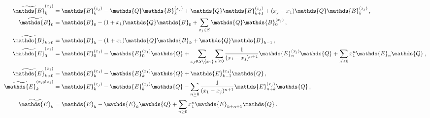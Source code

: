\documentclass[12pt]{article}
\numberwithin{equation}{section}
\numberwithin{figure}{section}
\newcommand{\B}{\mathds{B}}
\newcommand{\E}{\mathds{E}}
\newcommand{\Q}{\mathds{Q}}
\begin{document}
      \begin{align*}
        \widetilde \B^{(x_j)}_k &=
          \B^{(x_j)}_k - \Q \B^{(x_j)}_k 
          + \Q \B^{(x_j)}_{k+1}  
          + (x_j-x_1) \Q \B^{(x_j)}_k \,, 
        \\
        \widetilde \B_0 &=
          \B_0 - (1+x_1) \Q \B_0 
        + \sum\limits_{x_j \in S} \Q \B^{(x_j)}_0  \,,
        \\
        \widetilde \B_{k>0} &=
          \B_k - (1+x_1) \Q \B_k 
          + \Q \B_{k-1} \,,
        \\
        \widetilde \E^{(x_1)}_0 &=
          \E^{(x_1)}_0 - \E^{(x_1)}_0 \Q 
          + \sum\limits_{x_j \in S\backslash\{x_1\}}
            \sum\limits_{n\geq0} \frac1{(x_1-x_j)^{n+1}} \E^{(x_j)}_n \Q
          + \sum\limits_{n\geq0} x_1^n \E_n \Q\,,
        \\
        \widetilde \E^{(x_1)}_{k>0} &=
          \E^{(x_1)}_k - \E^{(x_1)}_k \Q 
          + \E^{(x_1)}_{k-1} \Q\,,
        \\
        \widetilde \E^{(x_j\neq x_1)}_k &=
          \E^{(x_j)}_k - \E^{(x_j)}_k \Q 
          - 
          \sum\limits_{n\geq0} \frac1{(x_1-x_j)^{n+1}} \E^{(x_j)}_{n+k} \Q \,,
        \\
        \widetilde \E_k &=
          \E_k - \E_k \Q 
          + \sum\limits_{n\geq0} x_1^n \E_{k+n+1} \Q \,.
      \end{align*}        
\end{document}
